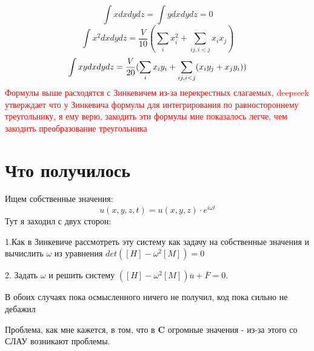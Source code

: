 \documentclass[a4paper,12pt]{article}
\begin{document}
\begin{equation}
    \int xdxdydz = \int ydxdydz = 0 
\end{equation}
\begin{equation}
    \int x^2 dxdydz =  \frac{V}{10} (\sum_i x^2_i + \sum_{ij, i<j} x_i x_j) 
\end{equation}
\begin{equation}
    \int xy \space dxdydz =  \frac{V}{20} (\sum_i x_i y_i + \sum_{ij, i<j}( x_i y_j + x_j y_i)) 
\end{equation}
\textcolor{red}{Формулы выше расходятся с Зинкевичем из-за перекрестных слагаемых, deepseek утверждает что у Зинкевича формулы для интегрирования по равностороннему треугольнику, я ему верю, закодить эти формулы мне показалось легче, чем закодить преобразование треугольника}
\section{Что получилось}

Ищем собственные значения:
\begin{equation}
    u(x,y,z,t) = u(x,y,z)\cdot e^{i\omega t}
\end{equation}
Тут я заходил с двух сторон: \par
1.Как в Зинкевиче рассмотреть эту систему как задачу на собственные значения и вычислить $\omega$ из уравнения $det([H] - \omega^2 [M]) = 0$ \par
2. Задать $\omega$ и решить систему $([H] - \omega^2[M])\overline{u} + \overline{F} = 0$. \par
В обоих случаях пока осмысленного ничего не получил, код пока сильно не дебажил \par
Проблема, как мне кажется, в том, что в $\textbf{C}$ огромные значения - из-за этого со СЛАУ возникают проблемы.
\end{document}
